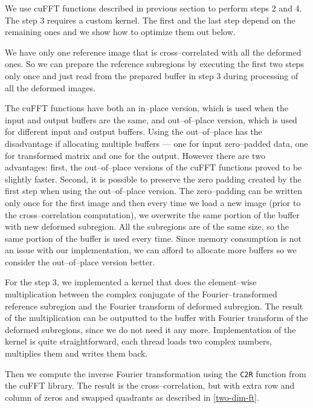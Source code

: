 We use cuFFT functions described in previous section to perform steps 2 and 4. The step 3 requires a custom kernel. The first and the last step depend on the remaining ones and we show how to optimize them out below.

We have only one reference image that is cross--correlated with all the deformed ones. So we can prepare the reference subregions by executing the first two steps only once and just read from the prepared buffer in step 3 during processing of all the deformed images. 

The cuFFT functions have both an in--place version, which is used when the input and output buffers are the same, and out--of--place version, which is used for different input and output buffers. Using the out--of--place has the disadvantage if allocating multiple buffers --- one for input zero--padded data, one for transformed matrix and one for the output. However there are two advantages: first, the out--of--place versions of the cuFFT functions proved to be slightly faster. Second, it is possible to preserve the zero padding created by the first step when using the out--of--place version. The zero--padding can be written only once for the first image and then every time we load a new image (prior to the cross--correlation computation), we overwrite the same portion of the buffer with new deformed subregion. All the subregions are of the same size, so the same portion of the buffer is used every time. Since memory consumption is not an issue with our implementation, we can afford to allocate more buffers so we consider the out--of--place version better.

For the step 3, we implemented a kernel that does the element--wise multiplication between the complex conjugate of the Fourier--transformed reference subregion and the Fourier transform of deformed subregion. The result of the multiplication can be outputted to the buffer with Fourier transform of the deformed subregions, since we do not need it any more. Implementation of the kernel is quite straightforward, each thread loads two complex numbers, multiplies them and writes them back. 



Then we compute the inverse Fourier transformation using the \texttt{C2R} function from the cuFFT library. The result is the cross--correlation, but with extra row and column of zeros and swapped quadrants as described in \cref{two-dim-ft}.

